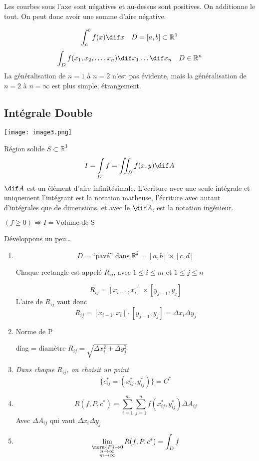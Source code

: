 \begin{myrem}

Les courbes sous l'axe sont négatives et au-dessus sont positives. On additionne le tout. On peut donc avoir une somme d'aire négative.

$$\int_{a}^{b} {f(x) \dif x} \quad D=[a,b] \subset \mathbb{R}^1$$
$$\int_D f(x_1,x_2,\dots,x_n) \dif x_1 \dots \dif x_n \quad D \in \mathbb{R}^n$$
La généralisation de $n=1$ à $n=2$ n'est pas évidente, mais la généralisation de $n=2$ à $n=\infty$ est plus simple, étrangement.
\end{myrem}

\subsection{Intégrale Double}
\texttt{[image: image3.png]}

Région solide $ S \subset \mathbb{R}^3$
\[I=\int \limits_{D} f = \iint_D f (x,y) \dif A\]
$\dif A$ est un élément d'aire infinitésimale. L'écriture avec une seule intégrale et uniquement l'intégrant est la notation \og matheuse\fg{}, l'écriture avec autant d'intégrales que de dimensions, et avec le $\dif A$, est la notation \og ingénieur\fg{}.

$(f \ge 0) \Rightarrow I = \text{Volume de S}$

Développons un peu\dots
\begin{enumerate}
\item

$$D= \text{``pavé'' dans }\mathbb{R}^2 = [a,b]\times[c,d]$$

Chaque rectangle est appelé $R_{ij}$, avec \(1 \le i \le m\) et \(1 \le j \le n\)

$$R_{ij}=[x_{i-1},x_i]\times[y_{j-1},y_j]$$
L'aire de $R_{ij}$ vaut donc
$$R_{ij}=[x_{i-1},x_i] \cdot [y_{j-1},y_j]= \Delta x_i \Delta y_j$$

\item{Norme de P}

diag = diamètre $R_{ij}= \sqrt{\Delta x_i^2+\Delta y_j^2}$


\item


\textit{Dans chaque $R_{ij}$, on choisit un point}
$$\{c_{ij}^* = (x_{ij}^*,y_{ij}^*)\} = C^*$$

\item
$$R(f, P,c^*)=\sum_{i=1}^{m} \sum_{j=1}^{n} f(x_{ij}^*,y_{ij}^*)\Delta A_{ij}$$
Avec $\Delta A_{ij}$ qui vaut $\Delta x_i \Delta y_j$

\item

$$\lim\limits_{\substack{\norm{P} \to 0 \\ n \to \infty\\ m \to \infty}} R(f,P,c^*)=\int_D f$$

\end{enumerate}

